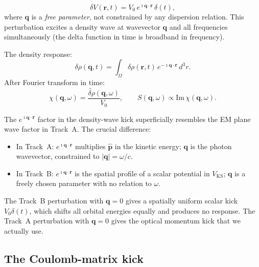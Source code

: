 \documentclass[11pt]{article}
\newcommand{\iunit}{\imath}
\newcommand{\phat}{\hat{\mathbf{p}}}
\newcommand{\VKS}{V_{\mathrm{KS}}}
\begin{document}
\begin{equation}
  \delta V(\mathbf{r},t)
  = V_0\,e^{\iunit\mathbf{q}\cdot\mathbf{r}}\,\delta(t),
  \label{eq:density-wave}
\end{equation}
where $\mathbf{q}$ is a \emph{free parameter}, not constrained by
any dispersion relation.
This perturbation excites a density wave at wavevector $\mathbf{q}$
and all frequencies simultaneously (the delta function in time
is broadband in frequency).

The density response:
\begin{equation}
  \delta\rho(\mathbf{q},t)
  = \int_\Omega\delta\rho(\mathbf{r},t)\,
    e^{-\iunit\mathbf{q}\cdot\mathbf{r}}\,d^3r.
  \label{eq:delta-rho}
\end{equation}
After Fourier transform in time:
\begin{equation}
  \chi(\mathbf{q},\omega)
  = \frac{\widetilde{\delta\rho}(\mathbf{q},\omega)}{V_0},
  \qquad
  S(\mathbf{q},\omega) \propto \mathrm{Im}\,\chi(\mathbf{q},\omega).
  \label{eq:chi-S}
\end{equation}

\begin{physics}
The $e^{\iunit\mathbf{q}\cdot\mathbf{r}}$ factor in the density-wave
kick superficially resembles the EM plane wave factor in Track~A.
The crucial difference:
\begin{itemize}
  \item In Track~A: $e^{\iunit\mathbf{q}\cdot\mathbf{r}}$ multiplies
    $\phat$ in the kinetic energy; $\mathbf{q}$ is the photon
    wavevector, constrained to $|\mathbf{q}|=\omega/c$.
  \item In Track~B: $e^{\iunit\mathbf{q}\cdot\mathbf{r}}$ is the
    spatial profile of a scalar potential in $\VKS$; $\mathbf{q}$
    is a freely chosen parameter with no relation to $\omega$.
\end{itemize}
The Track~B perturbation with $\mathbf{q}=0$ gives a spatially
uniform scalar kick $V_0\delta(t)$, which shifts all orbital energies
equally and produces no response.
The Track~A perturbation with $\mathbf{q}=0$ gives the optical
momentum kick that we actually use.
\end{physics}

\subsection{The Coulomb-matrix kick}
\end{document}

